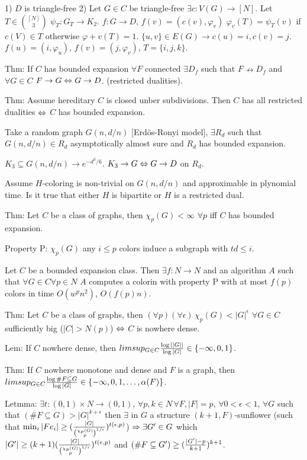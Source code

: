1) $D$ is triangle-free
2) Let $G\in C$ be triangle-free $\exists c:V(G) \rightarrow[N]$. Let $T\in {[N]\choose 3}$ $\psi_T:G_T \rightarrow K_2$. $f: G \rightarrow D$, $f(v)=(c(v),\varphi_v)$ $\varphi_v(T) = \psi_T(v)$ if $c(V)\in T$ otherwise $\varphi+v(T)=1$.
$\{u,v\}\in E(G) \rightarrow c(u)=i, c(v)=j$. $f(u)=(i,\varphi_u)$, $f(v)=(j,\varphi_v)$, $T=\{i,j,k\}$.

Thm: If $C$ has bounded expansion $\forall F$ connected $\exists D_f$ such that $F \nrightarrow D_f$ and $\forall G\in C$ $F \rightarrow G \Leftrightarrow G\rightarrow D$. (restricted dualities).

Thm: Assume hereditary $C$ is closed unber subdivisions. Then $C$ has all restricted dualities $\Leftrightarrow$ $C$ has bounded expansion.

Take a random graph $G(n,d/n)$ [Erdös-Ronyi model], $\exists R_d$ such that $G(n,d/n) \in R_d$ asymptotically almost sure and $R_d$ has bounded expansion.

$K_3 \subseteq G(n,d/n) \rightarrow e^{-d^3/6}$. $K_3 \rightarrow G \Leftrightarrow G\rightarrow D$ on $R_d$.

Assume $H$-coloring is non-trivial on $G(n,d/n)$ and approximable in plynomial time.
Is it true that either $H$ is bipartite or $H$ is a restricted dual.



Thm: Let $C$ be a class of graphs, then $\chi_p(G) < \infty\,\, \forall p$ iff $C$ has bounded expansion.

Property P: $\chi_p(G)$ any $i \leq p$ colors induce a subgraph with $td \leq i$.

Let $C$ be a bounded expansion class. Then $\exists f:N \rightarrow N$ and an algorithm $A$ such that $\forall G\in C \forall p\in N$ $A$ computes a colorin with property P with at most $f(p)$ colors in time $O(w^pn^2)$, $O(f(p)n)$.

Thm: Let $C$ be a class of graphs, then $(\forall p)(\forall \epsilon)\, \chi_p(G) <|G|^\epsilon$ $\forall G\in C$ sufficiently big ($|C| > N(p)$) $\Leftrightarrow$ $C$ is nowhere dense.

Lem: If $C$ nowhere dense, then $limsup_{G \in C} {\log ||G|| \over \log |G|} \in \{-\infty,0,1\}$.

Thm: If $C$ nowhere monotone and dense and $F$ is a graph, then $limsup_{G \in C} {\log \# F \subseteq G \over \log |G|} \in \{-\infty,0,1,\dots,\alpha(F)\}$.

Letmma: $\exists t:(0,1)\times N\rightarrow (0,1)$, $\forall p,k \in N\, \forall F, |F|=p$, $\forall 0<\epsilon<1$, $\forall G$ such that $(\# F\subseteq G) > |G|^{k+\epsilon}$ then $\exists$ in $G$ a structure $(k+1,F)$-sunflower (such that $\min_i |Fe_i| \geq ({|G| \over {\chi_p(G) \choose p}^{1/\epsilon}})^{t(\epsilon,p)}$)
$\Rightarrow \exists G' \in G$ which $|G'| \geq (k+1)({|G| \over {\chi_p(G) \choose p}^{1/\epsilon}})^{t(e,p)}$ and $(\# F \subseteq G') \geq ({|G'| - p \over k+1})^{k+1}$.

